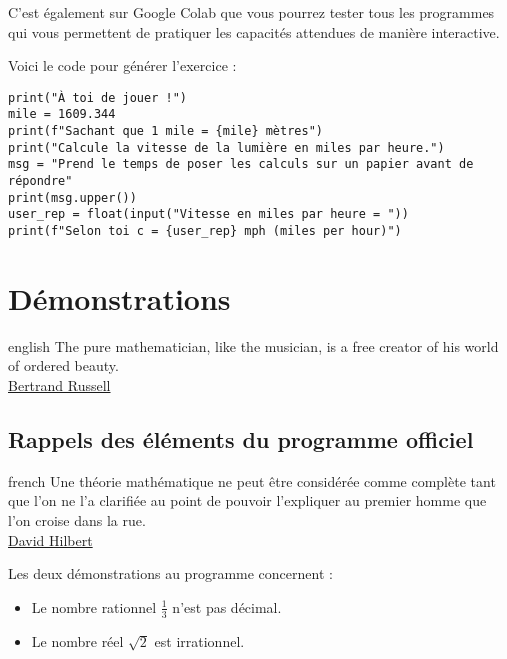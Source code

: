 \documentclass[a4paper, 11pt, twoside]{article}
\begin{document}
C'est également sur Google Colab que vous pourrez tester tous les
programmes qui vous permettent de pratiquer les capacités attendues
de manière interactive.

Voici le code pour générer l'exercice :
\begin{verbatim}
print("À toi de jouer !")
mile = 1609.344
print(f"Sachant que 1 mile = {mile} mètres")
print("Calcule la vitesse de la lumière en miles par heure.")
msg = "Prend le temps de poser les calculs sur un papier avant de répondre"
print(msg.upper())
user_rep = float(input("Vitesse en miles par heure = "))
print(f"Selon toi c = {user_rep} mph (miles per hour)")
\end{verbatim}
\stopcontents[level-2]
\stopcontents[level-1]

\section{Démonstrations}
\label{sec:org898dad7}

\begin{foreigndisplayquote}{english}
The pure mathematician, like the musician, is a free creator of his
world of ordered beauty.\\

\href{https://amzn.to/3ONEWLI}{Bertrand Russell}
\end{foreigndisplayquote}

\startcontents[level-1]

\subsection{Rappels des éléments du programme officiel}
\label{sec:org4f30bab}

\begin{foreigndisplayquote}{french}
Une théorie mathématique ne peut être considérée comme complète
tant que l'on ne l'a clarifiée au point de pouvoir l'expliquer au
premier homme que l'on croise dans la rue.\\

\href{https://fr.wikipedia.org/wiki/David\_Hilbert}{David Hilbert}  
\end{foreigndisplayquote}

\startcontents[level-2]

Les deux démonstrations au programme concernent :
\begin{itemize}
\item Le nombre rationnel \(\frac{1}{3}\) n'est pas décimal.
\item Le nombre réel \(\sqrt{2}\) est irrationnel.
\end{itemize}
\end{document}
